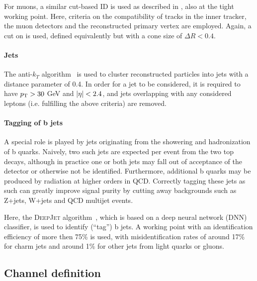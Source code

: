 For muons, a similar cut-based ID is used as described in , also at the tight working point. Here, criteria on the compatibility of tracks in the inner tracker, the muon detectors and the reconstructed primary vertex are employed. Again, a cut on \Irel is used, defined equivalently but with a cone size of $\Delta R < 0.4$.

\paragraph{Jets}

The anti-$k_T$ algorithm~\cite{Cacciari:2008gp} is used to cluster reconstructed particles into jets with a distance parameter of 0.4. In order for a jet to be considered, it is required to have $p_{\mathrm{T}} > 30$ GeV and $|\eta| < 2.4$, and jets overlapping with any considered leptons (i.e. fulfilling the above criteria) are removed. %

\paragraph{Tagging of b jets}

A special role is played by jets originating from the showering and hadronization of b quarks. Naively, two such jets are expected per \ttbar event from the two top decays, although in practice one or both jets may fall out of acceptance of the detector or otherwise not be identified. Furthermore, additional b quarks may be produced by radiation at higher orders in QCD. Correctly tagging these jets as such can greatly improve signal purity by cutting away backgrounds such as Z+jets, W+jets and QCD multijet events.

Here, the \textsc{DeepJet} algorithm~\cite{DeepJet:2020,CMS:BTV-16-002}, which is based on a deep neural network (DNN) classifier, is used to identify (``tag'') b jets. A working point with an identification efficiency of more then 75\% is used, with misidentification rates of around 17\% for charm jets and around 1\% for other jets from light quarks or gluons.

\subsection{Channel definition}
\label{sec:ttxs:channels}

